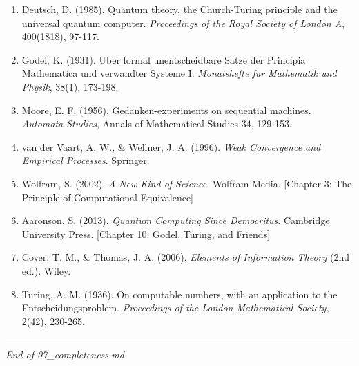 \documentclass[
  12pt,
]{article}
\providecommand{\tightlist}{%
  \setlength{\itemsep}{0pt}\setlength{\parskip}{0pt}}
\begin{document}
\begin{enumerate}
\def\labelenumi{\arabic{enumi}.}
\tightlist
\item
  Deutsch, D. (1985). Quantum theory, the Church-Turing principle and
  the universal quantum computer. \emph{Proceedings of the Royal Society
  of London A}, 400(1818), 97-117.
\item
  Godel, K. (1931). Uber formal unentscheidbare Satze der Principia
  Mathematica und verwandter Systeme I. \emph{Monatshefte fur Mathematik
  und Physik}, 38(1), 173-198.
\item
  Moore, E. F. (1956). Gedanken-experiments on sequential machines.
  \emph{Automata Studies}, Annals of Mathematical Studies 34, 129-153.
\item
  van der Vaart, A. W., \& Wellner, J. A. (1996). \emph{Weak Convergence
  and Empirical Processes}. Springer.
\item
  Wolfram, S. (2002). \emph{A New Kind of Science}. Wolfram Media.
  {[}Chapter 3: The Principle of Computational Equivalence{]}
\item
  Aaronson, S. (2013). \emph{Quantum Computing Since Democritus}.
  Cambridge University Press. {[}Chapter 10: Godel, Turing, and
  Friends{]}
\item
  Cover, T. M., \& Thomas, J. A. (2006). \emph{Elements of Information
  Theory} (2nd ed.). Wiley.
\item
  Turing, A. M. (1936). On computable numbers, with an application to
  the Entscheidungsproblem. \emph{Proceedings of the London Mathematical
  Society}, 2(42), 230-265.
\end{enumerate}

\begin{center}\rule{0.5\linewidth}{0.5pt}\end{center}

\emph{End of 07\_completeness.md}
\end{document}
